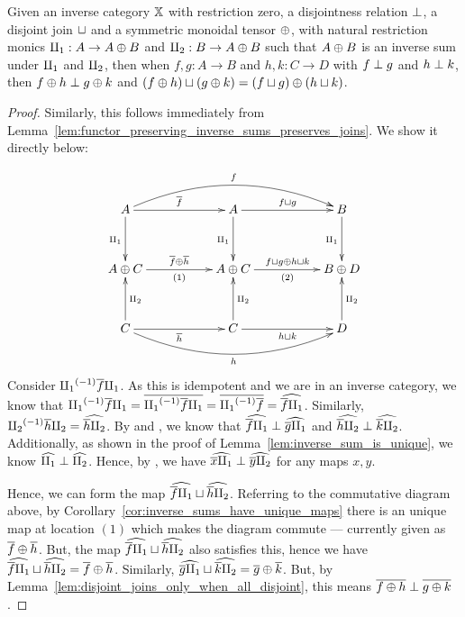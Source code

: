 \begin{lemma}\label{lem:inverse_sums_give_inverse_sum_tensors}
  Given an inverse category $\mathbb{X}$ with restriction zero, a disjointness relation $\perp$, a
  disjoint join $\sqcup$ and a symmetric monoidal tensor $\oplus$, with natural restriction monics
  $\amalg_{1}: A\to A\oplus B$ and $\amalg_{2}: B \to A\oplus B$ such that $A\oplus B$ is an inverse sum under $\amalg_{1}$ and
  $\amalg_{2}$, then when $f,g :A \to B$ and $h,k:C\to D$ with $f \perp g$ and $h \perp k$, then $f
  \oplus h \perp g\oplus k$ and $(f\oplus h)\sqcup (g\oplus k) = (f\sqcup g)\oplus (h\sqcup k)$.
\end{lemma}
\begin{proof}
  Similarly, this follows immediately from
  Lemma~\ref{lem:functor_preserving_inverse_sums_preserves_joins}. We show it directly below:

  \[
    \xymatrix@R+10pt@C+28pt {
      A \ar[r]^{\rst{f}} \ar[d]_{\cpa} \ar@/^20pt/[rr]^f
        & A \ar[d]_{\cpa} \ar[r]^{f\djoin g} & B \ar[d]_{\cpa}\\
      A\+C \ar[r]^{\rst{f}\+\rst{h}}_{(1)}
        & A\+C  \ar[r]^{f\djoin g \+ h\djoin k}_{(2)} & B \+D \\
      C \ar[r]_{\rst{h}} \ar[u]_{\cpb} \ar@/_20pt/[rr]_h
        & C \ar[u]_{\cpb} \ar[r]_{h\djoin k} & D \ar[u]_{\cpb}
    }
  \]
  Consider ${\amalg_{1}}^{(-1)} \overline{f}\amalg_{1}$. As this is idempotent and we are in an inverse category, we
  know that ${\amalg_{1}}^{(-1)} \overline{f}\amalg_{1} = \overline{{\amalg_{1}}^{(-1)} \overline{f}\amalg_{1}} = \overline{{\amalg_{1}}^{(-1)}\overline{f}} =
  \widehat{\overline{f}\amalg_{1}}$. Similarly, ${\amalg_{2}}^{(-1)}\overline{h}\amalg_{2} = \widehat{\overline{h}\amalg_{2}}$. By  and
  , we know that $\widehat{\overline{f}\amalg_{1}} \perp \widehat{\overline{g}\amalg_{1}}$ and $\widehat{\overline{h}\amalg_{2}}
  \perp \widehat{\overline{k}\amalg_{2}}$. Additionally, as shown in the proof of
  Lemma~\ref{lem:inverse_sum_is_unique}, we know $\widehat{\amalg_{1}}\perp \widehat{\amalg_{2}}$. Hence, by
  , we have $\widehat{\overline{x}\amalg_{1}} \perp \widehat{\overline{y}\amalg_{2}}$ for any maps $x,y$.

  Hence, we can form the map $\widehat{\overline{f}\amalg_{1}} \sqcup \widehat{\overline{h}\amalg_{2}}$. Referring to the
  commutative diagram above, by Corollary~\ref{cor:inverse_sums_have_unique_maps} there is an unique
  map at location $(1)$ which makes the diagram commute --- currently given as
  $\overline{f}\oplus\overline{h}$. But, the map $\widehat{\overline{f}\amalg_{1}} \sqcup \widehat{\overline{h}\amalg_{2}}$ also satisfies
  this, hence we have $\widehat{\overline{f}\amalg_{1}} \sqcup \widehat{\overline{h}\amalg_{2}} = \overline{f}\oplus\overline{h}$. Similarly,
  $\widehat{\overline{g}\amalg_{1}} \sqcup \widehat{\overline{k}\amalg_{2}} = \overline{g}\oplus\overline{k}$. But, by
  Lemma~\ref{lem:disjoint_joins_only_when_all_disjoint}, this means $\overline{f\oplus h} \perp \overline{g\oplus k}$.


\end{proof}
